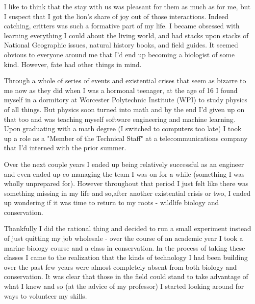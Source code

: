 \documentclass[11pt,a5paper]{book}
\begin{document}
I like to think that the stay with us was pleasant for them as much as for me, but I suspect that I got the lion's share of joy out of those interactions. Indeed catching, critters was such a formative part of my life. I became obsessed with learning everything I could about the living world, and had stacks upon stacks of National Geographic issues, natural history books, and field guides. It seemed obvious to everyone around me that I'd end up becoming a biologist of some kind. However, fate had other things in mind.
\newline

Through a whole of series of events and existential crises that seem as bizarre to me now as they did when I was a hormonal teenager, at the age of 16 I found myself in a dormitory at Worcester Polytechnic Institute (WPI) to study physics of all things. But physics soon turned into math and by the end I'd given up on that too and was teaching myself software engineering and machine learning. Upon graduating with a math degree (I switched to computers too late) I took up a role as a "Member of the Technical Staff" at a telecommunications company that I'd interned with the prior summer.
\newline

Over the next couple years I ended up being relatively successful as an engineer and even ended up co-managing the team I was on for a while (something I was wholly unprepared for). However throughout that period I just felt like there was something missing in my life and so,after another existential crisis or two, I ended up wondering if it was time to return to my roots - wildlife biology and conservation. 
\newline

Thankfully I did the rational thing and decided to run a small experiment instead of just quitting my job wholesale - over the course of an academic year I took a marine biology course and a class in conservation. In the process of taking these classes I came to the realization that the kinds of technology I had been building over the past few years were almost completely absent from both biology and conservation. It was clear that those in the field could stand to take advantage of what I knew and so (at the advice of my professor) I started looking around for ways to volunteer my skills.
\newline
\end{document}

